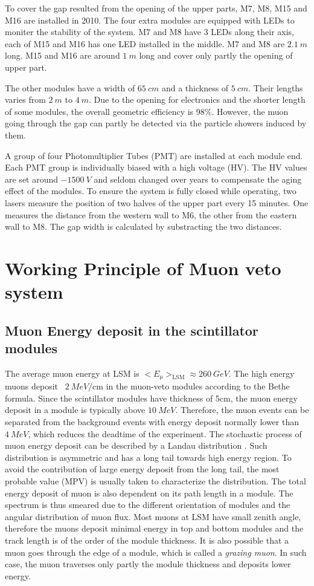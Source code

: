 To cover the gap resulted from the opening of the upper parts, M7, M8, M15 and M16 are installed in 2010. The four extra modules are equipped with LEDs to moniter the stability of the system. M7 and M8 have 3 LEDs along their axis, each of M15 and M16 has one LED installed in the middle. M7 and M8 are $\SI{2.1}{m}$ long. M15 and M16 are around $\SI{1}{m}$ long and cover only partly the opening of upper part.

The other modules have a width of $\SI{65}{cm}$ and a thickness of $\SI{5}{cm}$. Their lengths varies from $\SI{2}{m}$ to $\SI{4}{m}$.
Due to the opening for electronics and the shorter length of some modules, the overall geometric efficiency is 98\%. However, the muon going through the gap can partly be detected via the particle showers induced by them.

A group of four Photomultiplier Tubes (PMT) are installed at each module end. Each PMT group is individually biased with a high voltage (HV). The HV values are set around $\SI{-1500}{V}$ and seldom changed over years to compensate the aging effect of the modules.
To ensure the system is fully closed while operating, two lasers measure the position of two halves of the upper part every 15 minutes. One measures the distance from the western wall to M6, the other from the eastern wall to M8. The gap width is calculated by substracting the two distances.


\section{Working Principle of Muon veto system}
\label{sec:muon-working}


\subsection{Muon Energy deposit in the scintillator modules}
The average muon energy at LSM is $<E_{\upmu}>_{\mathrm{LSM}}\approx \SI{260}{GeV}$. The high energy muons deposit ~$\SI{2}{MeV\per\cm}$ in the muon-veto modules according to the Bethe formula. Since the scintillator modules have thickness of 5cm, the muon energy deposit in a module is typically above $\SI{10}{MeV}$. Therefore, the muon events can be separated from the background events with energy deposit normally lower than $\SI{4}{MeV}$, which reduces the deadtime of the experiment.
The stochastic process of muon energy deposit can be described by a Landau distribution \cite{Lan44}. Such distribution is asymmetric and has a long tail towards high energy region. To avoid the contribution of large energy deposit from the long tail, the most probable value (MPV) is usually taken to characterize the distribution.
The total energy deposit of muon is also dependent on its path length in a module. The spectrum is thus smeared due to the different orientation of modules and the angular distribution of muon flux. Most muons at LSM have small zenith angle, therefore the muons deposit minimal energy in top and bottom modules and the track length is of the order of the module thickness.
It is also possible that a muon goes through the edge of a module, which is called a \textit{grazing muon}. In such case, the muon traverses only partly the module thickness and deposits lower energy.

